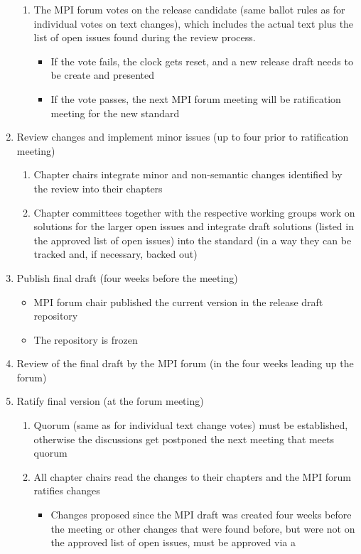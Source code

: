 \begin{enumerate}
\begin{enumerate}
\item The MPI forum votes on the release candidate (same ballot rules as for individual votes on text changes), which includes the actual text plus the list of open issues found during the review process.
\begin{itemize}
\item If the vote fails, the clock gets reset, and a new release draft needs to be create and presented
\item If the vote passes, the next MPI forum meeting will be ratification meeting for the new standard
\end{itemize}
\end{enumerate}
\item Review changes and implement minor issues (up to four prior to ratification meeting)
\begin{enumerate}
\item Chapter chairs integrate minor and non-semantic changes identified by the review into their chapters
\item Chapter committees together with the respective working groups work on solutions for the larger open issues and integrate draft solutions (listed in  the approved list of open issues) into the standard (in a way they can be tracked and, if necessary, backed out)
\end{enumerate}
\item Publish final draft (four weeks before the meeting)
\begin{itemize}
\item MPI forum chair published the current version in the release draft repository
\item The repository is frozen
\end{itemize}
\item Review of the final  draft by the MPI forum (in the four weeks leading up the forum)
\item Ratify final version (at the forum meeting)
\begin{enumerate}
\item Quorum (same as for individual text change votes) must be established, otherwise the discussions get postponed the next meeting that meets quorum
\item All chapter chairs read the changes to their chapters and the MPI forum ratifies changes
\begin{itemize}
\item Changes proposed since the MPI draft was created four weeks before the meeting or other changes that were found before, but were not on the approved list of open issues, must be approved via a

\end{itemize}
\end{enumerate}
\end{enumerate}
